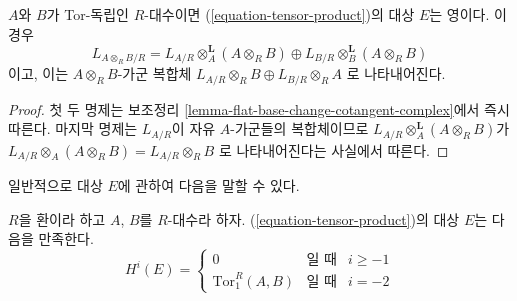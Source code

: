 \begin{lemma}
\label{lemma-tensor-product-tor-independent}
$A$와 $B$가 Tor-독립인 $R$-대수이면 (\ref{equation-tensor-product})의
대상 $E$는 영이다. 이 경우
$$
L_{A \otimes_R B/R} =
L_{A/R} \otimes_A^\mathbf{L} (A \otimes_R B) \oplus
L_{B/R} \otimes_B^\mathbf{L} (A \otimes_R B)
$$
이고, 이는 $A \otimes_R B$-가군 복합체
$L_{A/R} \otimes_R B \oplus L_{B/R} \otimes_R A $
로 나타내어진다.
\end{lemma}

\begin{proof}
첫 두 명제는 보조정리 \ref{lemma-flat-base-change-cotangent-complex}에서
즉시 따른다. 마지막 명제는 $L_{A/R}$이 자유 $A$-가군들의 복합체이므로
$L_{A/R} \otimes_A^\mathbf{L} (A \otimes_R B)$가
$L_{A/R} \otimes_A (A \otimes_R B) = L_{A/R} \otimes_R B$
로 나타내어진다는 사실에서 따른다.
\end{proof}

\noindent
일반적으로 대상 $E$에 관하여 다음을 말할 수 있다.

\begin{lemma}
\label{lemma-tensor-product}
$R$을 환이라 하고 $A$, $B$를 $R$-대수라 하자.
(\ref{equation-tensor-product})의 대상 $E$는 다음을 만족한다.
$$
H^i(E) =
\left\{
\begin{matrix}
0 & \text{일 때} & i \geq -1 \\
\text{Tor}_1^R(A, B) & \text{일 때} & i = -2
\end{matrix}
\right.
$$
\end{lemma}

